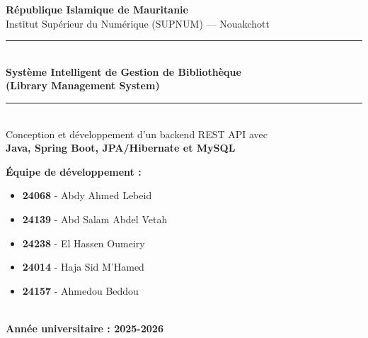 \documentclass[12pt,a4paper,twoside]{report}
\begin{document}
\begin{titlepage}
\centering
\vspace*{1cm}

{\LARGE \textbf{République Islamique de Mauritanie}}\\[0.3cm]
{\large Institut Supérieur du Numérique (SUPNUM) — Nouakchott}\\[1cm]

\rule{\textwidth}{1pt}\\[0.5cm]
{\Huge \textbf{Système Intelligent de Gestion de Bibliothèque}}\\[0.3cm]
{\Large \textbf{(Library Management System)}}\\[0.3cm]
\rule{\textwidth}{1pt}\\[1.5cm]

{\large Conception et développement d'un backend REST API avec}\\[0.2cm]
{\large \textbf{Java, Spring Boot, JPA/Hibernate et MySQL}}\\[2cm]

\vfill

\begin{minipage}{0.8\textwidth}
\begin{flushleft}
\textbf{Équipe de développement :}\\
\begin{itemize}[leftmargin=*]
    \item \textbf{24068} - Abdy Ahmed Lebeid
    \item \textbf{24139} - Abd Salam Abdel Vetah
    \item \textbf{24238} - El Hassen Oumeiry
    \item \textbf{24014} - Haja Sid M'Hamed
    \item \textbf{24157} - Ahmedou Beddou
\end{itemize}
\end{flushleft}
\end{minipage}\\[1.5cm]



{\large \textbf{Année universitaire : 2025-2026}}\\[0.5cm]

\end{titlepage}

\end{document}
